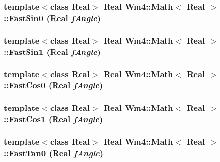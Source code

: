 \subsubsection{\setlength{\rightskip}{0pt plus 5cm}template$<$class Real$>$ Real {\bf Wm4::Math}$<$ Real $>$::Fast\-Sin0 (Real {\em f\-Angle})\hspace{0.3cm}{\tt  [static]}}\label{classWm4_1_1Math_c4119128bbb06bc1ccb037c3d91d952d}


\subsubsection{\setlength{\rightskip}{0pt plus 5cm}template$<$class Real$>$ Real {\bf Wm4::Math}$<$ Real $>$::Fast\-Sin1 (Real {\em f\-Angle})\hspace{0.3cm}{\tt  [static]}}\label{classWm4_1_1Math_e0f8fd007f571ca397e4e4f2486d968c}


\subsubsection{\setlength{\rightskip}{0pt plus 5cm}template$<$class Real$>$ Real {\bf Wm4::Math}$<$ Real $>$::Fast\-Cos0 (Real {\em f\-Angle})\hspace{0.3cm}{\tt  [static]}}\label{classWm4_1_1Math_c7a657948c6ac9d198105c9eccaedb86}


\subsubsection{\setlength{\rightskip}{0pt plus 5cm}template$<$class Real$>$ Real {\bf Wm4::Math}$<$ Real $>$::Fast\-Cos1 (Real {\em f\-Angle})\hspace{0.3cm}{\tt  [static]}}\label{classWm4_1_1Math_f4fdc4f15c2ded283b94494e08db6fc4}


\subsubsection{\setlength{\rightskip}{0pt plus 5cm}template$<$class Real$>$ Real {\bf Wm4::Math}$<$ Real $>$::Fast\-Tan0 (Real {\em f\-Angle})\hspace{0.3cm}{\tt  [static]}}\label{classWm4_1_1Math_7d94c326871ff1aa03e2e839b67adc21}


